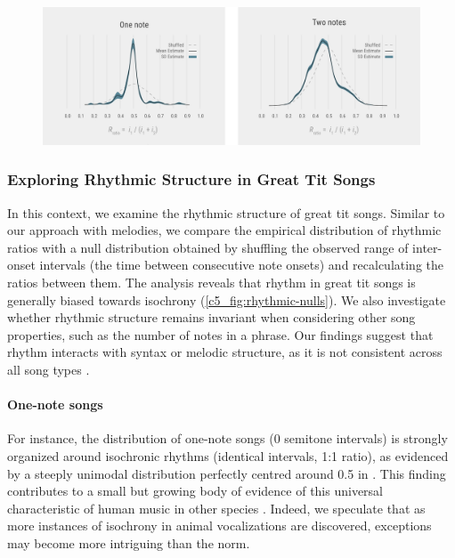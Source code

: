 \begin{figure}[ht!]
    \centering
    \includegraphics[width=\linewidth]{figures/chapter_5/rhythmic-nulls.pdf}
    \label{c5_fig:rhythmic-nulls}
\end{figure}

\subsubsection{Exploring Rhythmic Structure in Great Tit Songs}

In this context, we examine the rhythmic structure of great tit songs. Similar to our approach with melodies, we compare the empirical distribution of rhythmic ratios with a null distribution obtained by shuffling the observed range of inter-onset intervals (the time between consecutive note onsets) and recalculating the ratios between them. The analysis reveals that rhythm in great tit songs is generally biased towards isochrony (\autoref{c5_fig:rhythmic-nulls}). We also investigate whether rhythmic structure remains invariant when considering other song properties, such as the number of notes in a phrase. Our findings suggest that rhythm interacts with syntax or melodic structure, as it is not consistent across all song types \autocite{xing2022}.

\paragraph{One-note songs}
For instance, the distribution of one-note songs (0 semitone intervals) is strongly organized around isochronic rhythms (identical intervals, 1:1 ratio), as evidenced by a steeply unimodal distribution perfectly centred around 0.5 in . This finding contributes to a small but growing body of evidence of this universal characteristic of human music in other species \autocite{xing2022, rouse2021, roeske2020, demartsev2023, degregorio2021, degregorio2023, raimondi2023}. Indeed, we speculate that as more instances of isochrony in animal vocalizations are discovered, exceptions may become more intriguing than the norm.

